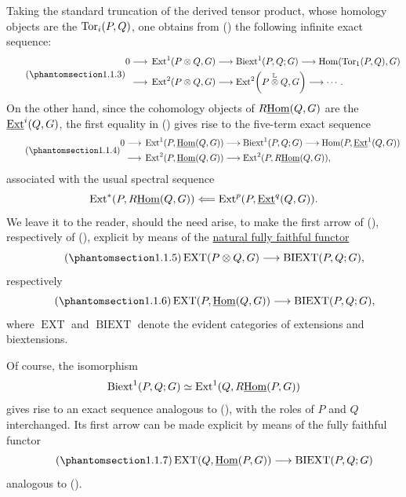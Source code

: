 Taking the standard truncation of the derived tensor product, whose
homology objects are the $\operatorname{Tor}_i(P,Q)$, one obtains from () the
following infinite exact sequence:
\begin{equation}\tag{\SGARefTarget{sga7.sga7i.eviii.n1-1-3}{1.1.3}}
\begin{aligned}
0\longrightarrow{}&
 \Ext^1(P\otimes Q,G)
 \longrightarrow \Biext^1(P,Q;G)
 \longrightarrow \Hom(\Tor_1(P,Q),G)\\
 \longrightarrow{}&
 \Ext^2(P\otimes Q,G)
 \longrightarrow
 \Ext^2\!\left(P\mathbin{\overset{\mathbb L}{\otimes}}Q,G\right)
 \longrightarrow\cdots .
\end{aligned}
\end{equation}
On the other hand, since the cohomology objects of $R\uHom(Q,G)$ are
the $\uExt^i(Q,G)$, the first equality in () gives rise to the
five-term exact sequence
\begin{equation}\tag{\SGARefTarget{sga7.sga7i.eviii.n1-1-4}{1.1.4}}
\begin{aligned}
0\longrightarrow{}&
 \Ext^1(P,\uHom(Q,G))
 \longrightarrow \Biext^1(P,Q;G)
 \longrightarrow \Hom(P,\uExt^1(Q,G))\\
 \longrightarrow{}&
 \Ext^2(P,\uHom(Q,G))
 \longrightarrow \Ext^2(P,R\uHom(Q,G)),
\end{aligned}
\end{equation}
associated with the usual spectral sequence
\[
 \Ext^*(P,R\uHom(Q,G))
 \Longleftarrow
 \Ext^p(P,\uExt^q(Q,G)).
\]
We leave it to the reader, should the need arise, to make the first
arrow of (), respectively of (), explicit by means of the
\underline{natural fully faithful functor}
\begin{equation}\tag{\SGARefTarget{sga7.sga7i.eviii.n1-1-5}{1.1.5}}
 \operatorname{EXT}(P\otimes Q,G)
 \longrightarrow
 \operatorname{BIEXT}(P,Q;G),
\end{equation}
respectively
\begin{equation}\tag{\SGARefTarget{sga7.sga7i.eviii.n1-1-6}{1.1.6}}
 \operatorname{EXT}(P,\uHom(Q,G))
 \longrightarrow
 \operatorname{BIEXT}(P,Q;G),
\end{equation}
where $\operatorname{EXT}$ and $\operatorname{BIEXT}$ denote the
evident categories of extensions and biextensions.

Of course, the isomorphism
\[
 \Biext^1(P,Q;G)\simeq\Ext^1(Q,R\uHom(P,G))
\]
gives rise to an exact sequence analogous to (), with the roles
of $P$ and $Q$ interchanged.  Its first arrow can be made explicit by
means of the fully faithful functor
\begin{equation}\tag{\SGARefTarget{sga7.sga7i.eviii.n1-1-7}{1.1.7}}
 \operatorname{EXT}(Q,\uHom(P,G))
 \longrightarrow
 \operatorname{BIEXT}(P,Q;G)
\end{equation}
analogous to ().

